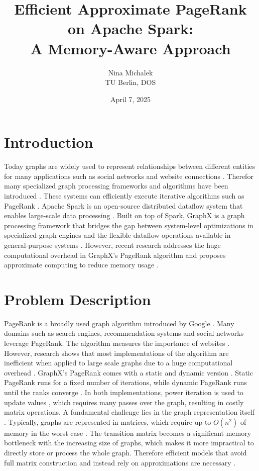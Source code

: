 \documentclass[a4paper,12pt]{article}
\title{Efficient Approximate PageRank on Apache Spark: \\ A Memory-Aware Approach}
\author{Nina Michalek\\TU Berlin, DOS}
\date{April 7, 2025}
\begin{document}
\maketitle

\begin{multicols}{2}

\section{Introduction}
Today graphs are widely used to represent relationships between different entities for many applications such as social networks and website connections \cite{zhang_distributed_2021}. Therefor many specialized graph processing frameworks and algorithms have been introduced \cite{meng_survey_2024}. These systems can efficiently execute iterative algorithms such as PageRank \cite{gonzalez_graphx_nodate}. Apache Spark is an open-source distributed dataflow system that enables large-scale data processing \cite{shanahan_large_2015}. Built on top of Spark, GraphX is a graph processing framework that bridges the gap between system-level optimizations in specialized graph engines and the flexible dataflow operations available in general-purpose systems \cite{noauthor_software_nodate}. However, recent research addresses the huge computational overhead in GraphX's PageRank algorithm and proposes approximate computing to reduce memory usage \cite{wu_efficient_2024}. 
 

\section{Problem Description}
PageRank is a broadly used graph algorithm introduced by Google \cite{page_pagerank_1999}. Many domains such as search engines, recommendation systems and social networks leverage PageRank. The algorithm measures the importance of websites \cite{wu_efficient_2024}. However, research shows that most implementations of the algorithm are inefficient when applied to large scale graphs due to a huge computational overhead \cite{wu_efficient_2024}\cite{jayaram_dynamic_2024}\cite{yang_efficient_2024}. GraphX's PageRank comes with a static and dynamic version \cite{noauthor_graphx_nodate}. Static PageRank runs for a fixed number of iterations, while dynamic PageRank runs until the ranks converge \cite{noauthor_graphx_nodate}. In both implementations, power iteration is used to update values \cite{xin_graphx_2013}, which requires many passes over the graph, resulting in costly matrix operations.  A fundamental challenge lies in the graph representation itself \cite{noauthor_fast_nodate}. Typically, graphs are represented in matrices, which require up to $O(n^2)$ of memory in the worst case \cite{wu_efficient_2024}. The transition matrix becomes a significant memory bottleneck with the increasing size of graphs, which makes it more impractical to directly store or process the whole graph. Therefore efficient models that avoid full matrix construction and instead rely on approximations are necessary \cite{noauthor_fast_nodate}.




\end{multicols}
\end{document}
